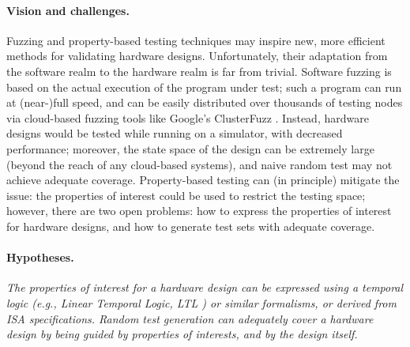 \documentclass[fleqn,12pt]{article}
\begin{document}
{\paragraph{Vision and challenges.}
Fuzzing and property-based testing techniques may inspire new, more efficient methods for validating hardware designs.
Unfortunately, their adaptation from the software realm to the hardware realm is far from trivial. 
Software fuzzing is based on the actual execution of the program under test; such a program can run at (near-)full speed, and can be easily distributed over thousands of testing nodes via cloud-based fuzzing tools like Google's ClusterFuzz \cite{web:clusterfuzz}.  Instead, hardware designs would be tested while running on a simulator, with decreased performance; moreover, the state space of the design can be extremely large (beyond the reach of any cloud-based systems), and naive random test may not achieve adequate coverage. Property-based testing can (in principle) mitigate the issue: the properties of interest could be used to restrict the testing space; however, there are two open problems: how to express the properties of interest for hardware designs, and how to generate test sets with adequate coverage.

\paragraph{Hypotheses.}
\emph{The properties of interest for a hardware design can be expressed using a temporal logic \cite{Baier2008} (e.g., Linear Temporal Logic, LTL \cite{Pnueli1977LTL}) or similar formalisms, or derived from ISA specifications. Random test generation can adequately cover a hardware design by being guided by properties of interests, and by the design itself.}
}%

\end{document}
